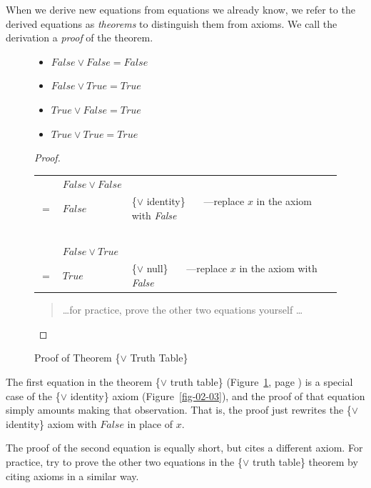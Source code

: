 When we derive new equations from equations we already know,
we refer to the derived equations as \emph{theorems} to
distinguish them from axioms. 
We call the derivation a
\emph{proof} of the theorem.

\begin{figure}
\begin{theorem}
\mbox{}
\begin{itemize}
\item $False \vee False = False$
\item $False \vee True  = True$
\item $True  \vee False = True$
\item $True  \vee True  = True$
\end{itemize}
\end{theorem}

\begin{proof}
\mbox{}\\
\begin{tabular}{lll}
    &$False \vee False$    & \\
$=$ & $False$              & \{$\vee$ identity\}  ~~~---replace $x$ in the axiom with \emph{False}\\
    &  ~                   & \\
    & $False \vee True$    & \\
$=$ & $True$               & \{$\vee$ null\}  ~~~---replace $x$ in the axiom with \emph{False}\\
\end{tabular}
\begin{quote}
\dots for practice, prove the other two equations yourself \dots
\end{quote}
\end{proof}
\caption{Proof of Theorem \{$\vee$ Truth Table\}}
\label{or-truth-table}
\end{figure}

The first equation in the theorem \{$\vee$ truth table\}
(Figure~\ref{or-truth-table}, page \pageref{or-truth-table})
is a special case of the
\{$\vee$ identity\} axiom (Figure~\ref{fig-02-03}),
and the proof of that equation simply amounts making that observation.
That is, the proof just rewrites the \{$\vee$ identity\} axiom
with $False$ in place of $x$.

The proof of the second equation is equally short, but cites
a different axiom.
For practice, try to prove the other two
equations in the \{$\vee$ truth table\} theorem
by citing axioms in a similar way.

